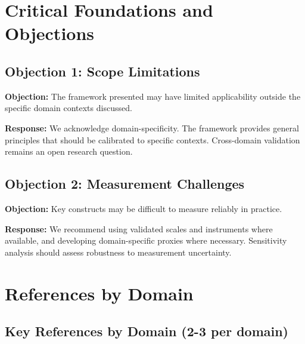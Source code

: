 
\section{Critical Foundations and Objections}
\label{sec:cat-foundations}

\subsection{Objection 1: Scope Limitations}

\textbf{Objection:} The framework presented may have limited applicability
outside the specific domain contexts discussed.

\textbf{Response:} We acknowledge domain-specificity. The framework provides
general principles that should be calibrated to specific contexts. Cross-domain
validation remains an open research question.

\subsection{Objection 2: Measurement Challenges}

\textbf{Objection:} Key constructs may be difficult to measure reliably in
practice.

\textbf{Response:} We recommend using validated scales and instruments where
available, and developing domain-specific proxies where necessary. Sensitivity
analysis should assess robustness to measurement uncertainty.


\section{References by Domain}

\nocite{bcm_master}

\label{sec:references-catalog}

\subsection{Key References by Domain (2-3 per domain)}

